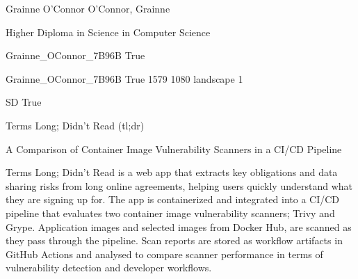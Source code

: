 
\begingroup{}\relax



\def\Key{Grainne_OConnor_7B96B}

{Grainne O'Connor}
{O'Connor, Grainne}

{Higher Diploma in Science in Computer Science}

{Grainne_OConnor_7B96B}
{True}

{Grainne_OConnor_7B96B}
{True}
{1579}
{1080}
{landscape}
{1}

{SD}
{True}

{Terms Long; Didn't Read (tl;dr)}

{A Comparison of Container Image Vulnerability Scanners in a CI/CD Pipeline}

{Terms Long; Didn't Read is a web app that extracts key obligations and data sharing risks from long online agreements, helping users quickly understand what they are signing up for. The app is containerized and integrated into a CI/CD pipeline that evaluates two container image vulnerability scanners; Trivy and Grype. 
Application images and selected images from Docker Hub, are scanned as they pass through the pipeline. Scan reports are stored as workflow artifacts in GitHub Actions and analysed to compare scanner performance in terms of vulnerability detection and developer workflows.}

